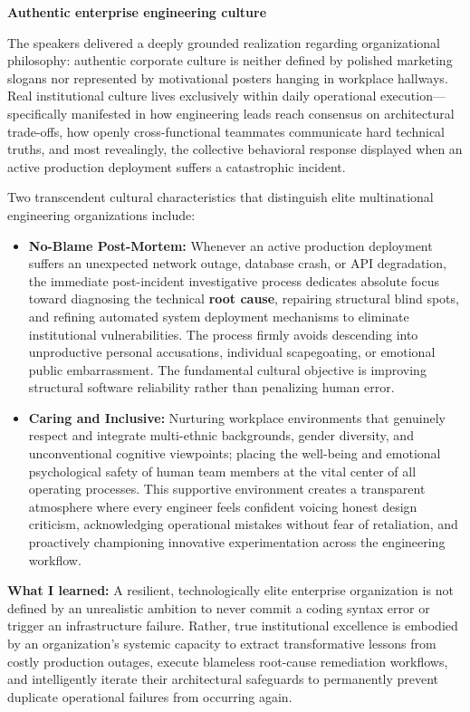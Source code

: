 \vspace{0.5em}\noindent\textbf{Authentic enterprise engineering
culture}\par

The speakers delivered a deeply grounded realization regarding
organizational philosophy: authentic corporate culture is neither
defined by polished marketing slogans nor represented by motivational
posters hanging in workplace hallways. Real institutional culture lives
exclusively within daily operational execution---specifically manifested
in how engineering leads reach consensus on architectural trade-offs,
how openly cross-functional teammates communicate hard technical truths,
and most revealingly, the collective behavioral response displayed when
an active production deployment suffers a catastrophic incident.

Two transcendent cultural characteristics that distinguish elite
multinational engineering organizations include:

\begin{itemize}
\tightlist
\item
  \textbf{No-Blame Post-Mortem:} Whenever an active production
  deployment suffers an unexpected network outage, database crash, or
  API degradation, the immediate post-incident investigative process
  dedicates absolute focus toward diagnosing the technical \textbf{root
  cause}, repairing structural blind spots, and refining automated
  system deployment mechanisms to eliminate institutional
  vulnerabilities. The process firmly avoids descending into
  unproductive personal accusations, individual scapegoating, or
  emotional public embarrassment. The fundamental cultural objective is
  improving structural software reliability rather than penalizing human
  error.
\item
  \textbf{Caring and Inclusive:} Nurturing workplace environments that
  genuinely respect and integrate multi-ethnic backgrounds, gender
  diversity, and unconventional cognitive viewpoints; placing the
  well-being and emotional psychological safety of human team members at
  the vital center of all operating processes. This supportive
  environment creates a transparent atmosphere where every engineer
  feels confident voicing honest design criticism, acknowledging
  operational mistakes without fear of retaliation, and proactively
  championing innovative experimentation across the engineering
  workflow.
\end{itemize}

\textbf{What I learned:} A resilient, technologically elite enterprise
organization is not defined by an unrealistic ambition to never commit a
coding syntax error or trigger an infrastructure failure. Rather, true
institutional excellence is embodied by an organization's systemic
capacity to extract transformative lessons from costly production
outages, execute blameless root-cause remediation workflows, and
intelligently iterate their architectural safeguards to permanently
prevent duplicate operational failures from occurring again.


